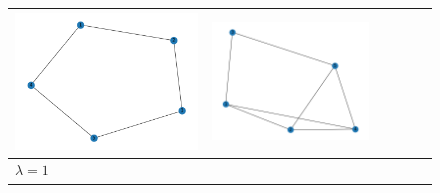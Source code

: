 \documentclass[11pt,a4paper,openright,oneside]{book}
\numberwithin{equation}{section}
\begin{document}
{\begin{figure}[h]
\begin{adjustwidth}{-3cm}{-3cm}
\begin{tabular}{>{\centering\arraybackslash}m{1.5cm} m{2.5cm} m{2.5cm} m{2.5cm} m{2.5cm} m{2.5cm}}
        \rule{0pt}{0.01cm} \includegraphics[width=\linewidth]{media/tnale/graph-4-tnale-0.5.png} \rule{0pt}{0.01cm}&
        \rule{0pt}{0.01cm} \includegraphics[width=\linewidth]{media/tnale/graph-5-tnale-0.5.png} \rule{0pt}{0.01cm}\\ \hline
        $\lambda = 1$ &

\end{tabular}
\end{adjustwidth}
\end{figure}}
\end{document}
